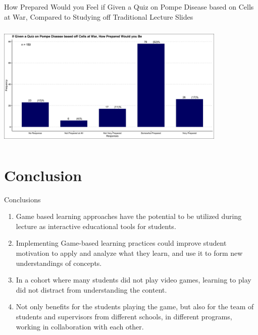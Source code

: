 \documentclass{beamer}
\begin{document}
	\begin{frame}{How Prepared Would you Feel if Given a Quiz on Pompe Disease based on Cells at War, Compared to Studying off Traditional Lecture Slides}
		\begin{center}
			\includegraphics[width=11cm, height=6cm]{how_prepared_if_tested_on_pompe_based_off_cellsatwar.jpg}
		\end{center}
	\end{frame}

	\section{Conclusion}
	\begin{frame}{Conclusions}
		\begin{enumerate}	
			\item Game based learning approaches have the potential to be utilized during lecture as interactive educational tools for students. \newline
			\item Implementing Game-based learning practices could improve student motivation to apply and analyze what they learn, and use it to form new understandings of concepts. \newline
			\item In a cohort where many students did not play video games, learning to play did not distract from understanding the content. \newline
			\item Not only benefits for the students playing the game, but also for the team of students and supervisors from different schools, in different programs, working in collaboration with each other.
		\end{enumerate}
	\end{frame}
\end{document}
